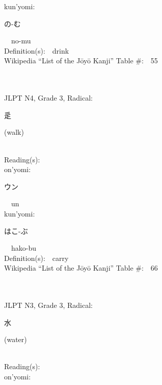 \begin{multicols}{2}
{\hspace*{1em}}kun'yomi:\ \ \\
{\hspace*{2em}}{\begin{CJK}{UTF8}{min} の-む \end{CJK}}\ \ no-mu\ \ \\
Definition(s):\ \ drink \\
Wikipedia ``List of the J\=oy\=o Kanji'' Table \#:\ \ 55 \\
\ \ \\
{\fontsize{34pt}{40pt}  }\ \ \\  %
{JLPT N4, Grade 3, Radical:\ \ {\begin{CJK}{UTF8}{min} 辵 \end{CJK}} (walk) } \\
Reading(s):\ \ \\
{\hspace*{1em}}on'yomi:\ \ \\
{\hspace*{2em}}{\begin{CJK}{UTF8}{min} ウン \end{CJK}}\ \ un\ \ \\
{\hspace*{1em}}kun'yomi:\ \ \\
{\hspace*{2em}}{\begin{CJK}{UTF8}{min} はこ-ぶ \end{CJK}}\ \ hako-bu\ \ \\
Definition(s):\ \ carry \\
Wikipedia ``List of the J\=oy\=o Kanji'' Table \#:\ \ 66 \\
\ \ \\
{\fontsize{34pt}{40pt}  }\ \ \\  %
{JLPT N3, Grade 3, Radical:\ \ {\begin{CJK}{UTF8}{min} 水 \end{CJK}} (water) } \\
Reading(s):\ \ \\
{\hspace*{1em}}on'yomi:\ \ \\

\end{multicols}
